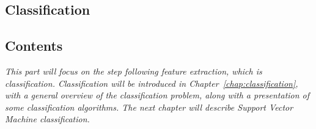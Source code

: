   \begin{titlepage}
    \vspace*{\fill}
      \part{Classification}
    \vspace*{\fill}
  \end{titlepage}

\startcontents[parts]

\chapter*{Contents}

\textit{This part will focus on the step following feature extraction, which is classification. Classification will be introduced in Chapter~\ref{chap:classification}, with a general overview of the classification problem, along with a presentation of some classification algorithms. The next chapter will describe Support Vector Machine classification.} 

\vspace{\baselineskip}


\pagebreak


\clearpage
\newpage


\stopcontents[parts]


